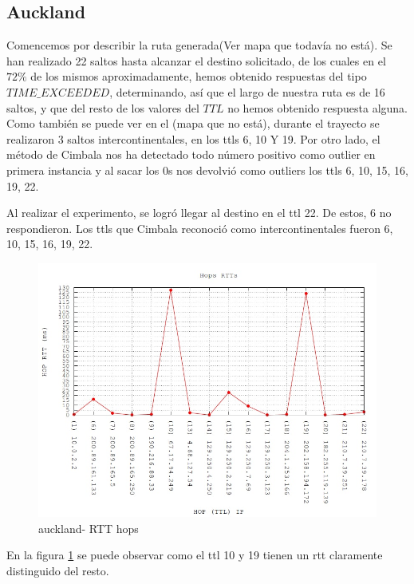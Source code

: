 \subsection{Auckland}

Comencemos por describir la ruta generada(Ver mapa que todavía no está). Se han realizado 22 saltos hasta alcanzar el destino solicitado, de los cuales en el $72 \% $ de los mismos aproximadamente, hemos obtenido respuestas del tipo $TIME\_EXCEEDED$, determinando, así que el largo de nuestra ruta es de 16 saltos, y que del resto de los valores del $TTL$ no hemos obtenido respuesta alguna. Como también se puede ver en el (mapa que no está), durante el trayecto se realizaron 3 saltos intercontinentales, en los ttls 6, 10 Y 19. Por otro lado, el método de Cimbala nos ha detectado todo número positivo como outlier en primera instancia y al sacar los 0s nos devolvió como outliers los ttls 6, 10, 15, 16, 19, 22.


Al realizar el experimento, se logró llegar al destino en el ttl 22. De estos, 6 no respondieron. Los ttls que Cimbala reconoció como intercontinentales fueron 6, 10, 15, 16, 19, 22.

\begin{figure}[!htbp]
  \centering
    \includegraphics[scale=0.6]{imagenes/auckland-graficos/traceroute-auckland.jpg}
  \caption{auckland- RTT hops}
  \label{fig:7}
\end{figure}

En la figura \ref{fig:7} se puede observar como el ttl 10 y 19 tienen un rtt claramente distinguido del resto.

